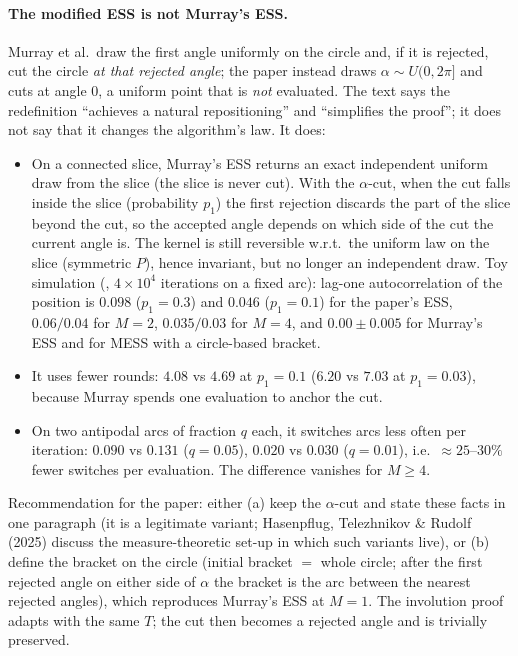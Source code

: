 \documentclass[11pt,a4paper]{article}
\theoremstyle{remark}
\begin{document}
\paragraph{The modified ESS is not Murray's ESS.} Murray et al.\ draw the first angle uniformly on the circle and, if it is rejected, cut the circle \emph{at that rejected angle}; the paper instead draws $\alpha\sim U(0,2\pi]$ and cuts at angle $0$, a uniform point that is \emph{not} evaluated. The text says the redefinition ``achieves a natural repositioning'' and ``simplifies the proof''; it does not say that it changes the algorithm's law. It does:
\begin{itemize}[leftmargin=*]
\item On a connected slice, Murray's ESS returns an exact independent uniform draw from the slice (the slice is never cut). With the $\alpha$-cut, when the cut falls inside the slice (probability $p_1$) the first rejection discards the part of the slice beyond the cut, so the accepted angle depends on which side of the cut the current angle is. The kernel is still reversible w.r.t.\ the uniform law on the slice (symmetric $P$), hence invariant, but no longer an independent draw. Toy simulation (, $4\times10^4$ iterations on a fixed arc): lag-one autocorrelation of the position is $0.098$ ($p_1=0.3$) and $0.046$ ($p_1=0.1$) for the paper's ESS, $0.06/0.04$ for $M=2$, $0.035/0.03$ for $M=4$, and $0.00\pm0.005$ for Murray's ESS and for MESS with a circle-based bracket.
\item It uses fewer rounds: $4.08$ vs $4.69$ at $p_1=0.1$ ($6.20$ vs $7.03$ at $p_1=0.03$), because Murray spends one evaluation to anchor the cut.
\item On two antipodal arcs of fraction $q$ each, it switches arcs less often per iteration: $0.090$ vs $0.131$ ($q=0.05$), $0.020$ vs $0.030$ ($q=0.01$), i.e.\ $\approx25$--$30\%$ fewer switches per evaluation. The difference vanishes for $M\ge4$.
\end{itemize}
Recommendation for the paper: either (a) keep the $\alpha$-cut and state these facts in one paragraph (it is a legitimate variant; Hasenpflug, Telezhnikov \& Rudolf (2025) discuss the measure-theoretic set-up in which such variants live), or (b) define the bracket on the circle (initial bracket $=$ whole circle; after the first rejected angle on either side of $\alpha$ the bracket is the arc between the nearest rejected angles), which reproduces Murray's ESS at $M=1$. The involution proof adapts with the same $T$; the cut then becomes a rejected angle and is trivially preserved.
\end{document}
